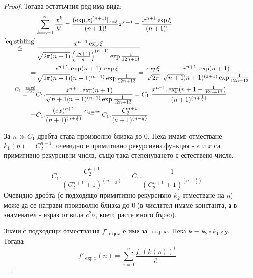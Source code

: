 \begin{proof}
    Тогава остатъчния ред има вида:
    \begin{equation}
        \begin{split}
            & \sum\limits_{k=n+1}^{\infty} \frac{x^k}{k!} = \frac{(\exp x)^{(n+1)}|_{x=\xi}}{(n+1)!} x^{n+1} = \frac{x^{n+1}\exp \xi}{ (n+1)!} \\
            \overset{\eqref{eq:stirling}}{\leq} & \frac{x^{n+1}\exp \xi}{ \sqrt{2 \pi (n+1)} \left(\frac{(n+1)}{e}\right)^{(n+1)}\exp\frac{1}{12n + 13} } \\
            = & \frac{x^{n+1}.\exp(n+1).\exp \xi}{ \sqrt{2 \pi (n+1)}(n+1)^{(n+1)}\exp\frac{1}{12n + 13} } = \frac{exp \xi}{\sqrt{2\pi}} . \frac{x^{n+1}.\exp(n+1)}{\sqrt{n+1}(n+1)^{(n+1)}\exp\frac{1}{12n + 13} } \\
            \overset{C_1 = \frac{exp \xi}{\sqrt{2\pi}}}{=} & C_1 . \frac{x^{n+1}.\exp(n+1)}{\sqrt{n+1}(n+1)^{(n+1)}\exp\frac{1}{12n + 13} } = C_1.\frac{x^{n+1}.\exp(n+1 - \frac{1}{12n + 13})}{(n+1)^{(n+\frac{1}{2})}} \\
            = & C_1.\frac{(ex)^{n+1}}{(n+1)^{(n+\frac{1}{2})}} \overset{C_2 = ex}{=} C_1.\frac{C_2^{n+1}}{(n+1)^{(n+\frac{1}{2})}}
        \end{split}
    \end{equation}
    
    За $n \gg C_1$ дробта става произволно близка до 0. Нека имаме отместване $k_1(n) = C_2^{n+1}$. очевидно е примитивно рекурсивна функция - $e$ и $x$ са примитивно рекурсивни числа, също така степенуването с естествено число.

    \begin{equation*}
        C_1 . \frac{C_2^{n+1}}{(C_2^{n+1}+1)^{(n+\frac{1}{2})}} = C_1.\frac{1}{(C_2^{n+1}+1)^{(n-\frac{1}{2})}}
    \end{equation*}
    Очевидно дробта (с подходящо примитивно рекурсивно $k_2$ отместване на $n$) може да се направи произволно близка до 0 (в числител имаме константа, а в знаменател - израз от вида $c^2n$, което расте много бързо).
    
    Значи с подходящи отмествания $f'_{\exp x}$ е име за $\exp x$. Нека $k = k_2 \circ k_1 \circ g$. Тогава:
    \begin{equation}
        f'_{\exp x}(n) = \sum\limits_{i=0}^{n} \frac{f_x(k(n))^i}{i!}
    \end{equation}
\end{proof}
